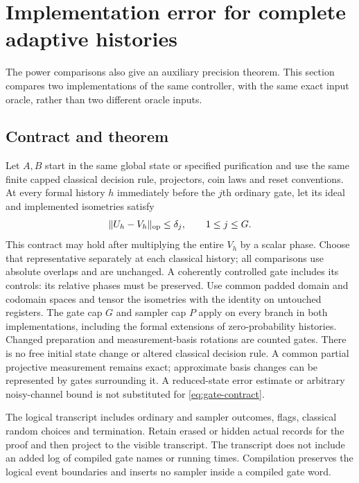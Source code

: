 \documentclass[11pt]{article}
\theoremstyle{remark}
\begin{document}
\section{Implementation error for complete adaptive histories}\label{sec:precision}
The power comparisons also give an auxiliary precision theorem. This
section compares two implementations of the same controller, with the same
exact input oracle, rather than two different oracle inputs.

\subsection{Contract and theorem}
Let $A,B$ start in the same global state or specified purification and use
the same finite capped classical decision rule, projectors, coin laws and
reset conventions. At every formal history $h$ immediately before the
$j$th ordinary gate, let its ideal and implemented isometries satisfy
\begin{equation}\label{eq:gate-contract}
 \|U_h-V_h\|_{\rm op}\le\delta_j,\qquad 1\le j\le G.
\end{equation}
This contract may hold after multiplying the entire $V_h$ by a scalar
phase. Choose that representative separately at each classical history;
all comparisons use absolute overlaps and are unchanged. A coherently
controlled gate includes its controls: its relative phases must be preserved.
Use common padded domain and codomain spaces and tensor the isometries
with the identity on untouched registers. The gate cap $G$ and sampler
cap $P$ apply on every branch in both implementations, including the
formal extensions of zero-probability histories. Changed preparation and
measurement-basis rotations are counted gates. There is no free initial
state change or altered classical decision rule. A common partial
projective measurement remains exact; approximate basis changes can be
represented by gates surrounding it. A reduced-state error estimate or
arbitrary noisy-channel bound is not substituted for
\eqref{eq:gate-contract}.

The logical transcript includes ordinary and sampler outcomes, flags,
classical random choices and termination. Retain erased or hidden actual
records for the proof and then project to the visible transcript.
The transcript does not include an added log of compiled gate names or
running times. Compilation preserves the logical event boundaries and
inserts no sampler inside a compiled gate word.
\end{document}
